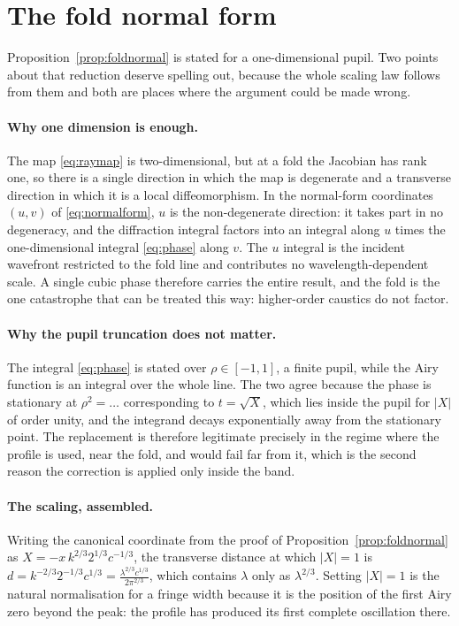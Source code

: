 \section{The fold normal form}
\label{app:normalform}

Proposition~\ref{prop:foldnormal} is stated for a one-dimensional pupil. Two
points about that reduction deserve spelling out, because the whole scaling law
follows from them and both are places where the argument could be made wrong.

\paragraph{Why one dimension is enough.} The map \eqref{eq:raymap} is
two-dimensional, but at a fold the Jacobian has rank one, so there is a single
direction in which the map is degenerate and a transverse direction in which it
is a local diffeomorphism. In the normal-form coordinates $(u,v)$ of
\eqref{eq:normalform}, $u$ is the non-degenerate direction: it takes part in no
degeneracy, and the diffraction integral factors into an integral along $u$
times the one-dimensional integral \eqref{eq:phase} along $v$. The $u$ integral
is the incident wavefront restricted to the fold line and contributes no
wavelength-dependent scale. A single cubic phase therefore carries the entire
result, and the fold is the one catastrophe that can be treated this way:
higher-order caustics do not factor.

\paragraph{Why the pupil truncation does not matter.} The integral
\eqref{eq:phase} is stated over $\rho \in [-1,1]$, a finite pupil, while the
Airy function is an integral over the whole line. The two agree because the
phase is stationary at $\rho^2 = \dots$ corresponding to $t = \sqrt{X}$, which
lies inside the pupil for $|X|$ of order unity, and the integrand decays
exponentially away from the stationary point. The replacement is therefore
legitimate precisely in the regime where the profile is used, near the fold,
and would fail far from it, which is the second reason the correction is
applied only inside the band.

\paragraph{The scaling, assembled.} Writing the canonical coordinate from the
proof of Proposition~\ref{prop:foldnormal} as $X = -x\,k^{2/3}2^{1/3}c^{-1/3}$,
the transverse distance at which $|X| = 1$ is
$d = k^{-2/3}2^{-1/3}c^{1/3} = \frac{\lambda^{2/3}c^{1/3}}{2\pi^{2/3}}$,
which contains $\lambda$ only as $\lambda^{2/3}$. Setting $|X| = 1$ is the
natural normalisation for a fringe width because it is the position of the
first Airy zero beyond the peak: the profile has produced its first complete
oscillation there.

